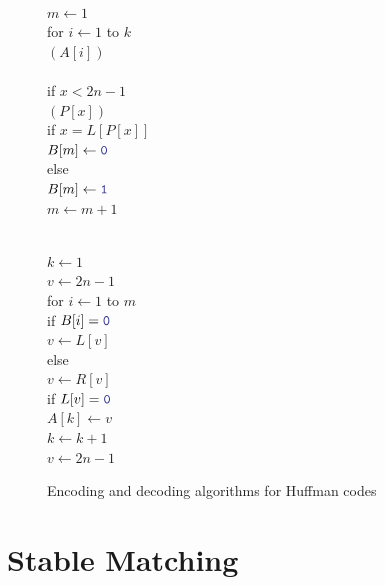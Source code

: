 \begin{figure}[ht]
\centering
\begin{minipage}[c]{0.55\linewidth}
\begin{pseudocode}
\\
$m \gets 1$\\
for $i \gets 1$ to $k$\\
\Indent {}$(A[i])$\\[1.5ex]
\\
if $x < 2n-1$\\
\Indent {}$(P[x])$\\
\Indent if $x = L[P[x]]$\\
\Indent\Indent $B[m] \gets \mbox{\color{JEblue}\ttfamily 0}$\\
\Indent else\\
\Indent\Indent $B[m] \gets \mbox{\color{JEblue}\ttfamily 1}$\\
\Indent $m \gets m+1$
\end{pseudocode}
\end{minipage}\hfill
\begin{minipage}[c]{0.42\linewidth}
\begin{pseudocode}
\\
$k \gets 1$\\
$v \gets 2n-1$\\
for $i \gets 1$ to $m$\\
\Indent if $B[i] = \mbox{\color{JEblue}\ttfamily 0}$\\
\Indent\Indent $v \gets L[v]$\\
\Indent else\\
\Indent\Indent $v \gets R[v]$\\
\Indent if $L[v] = \mbox{\color{JEblue}\ttfamily 0}$\\
\Indent\Indent $A[k] \gets v$\\
\Indent\Indent $k \gets k+1$\\
\Indent\Indent $v \gets 2n-1$
\end{pseudocode}
\end{minipage}
\caption{Encoding and decoding algorithms for Huffman codes}
\label{fig:4.5}
\end{figure}

\section{Stable Matching}
\label{sec:4.5}

